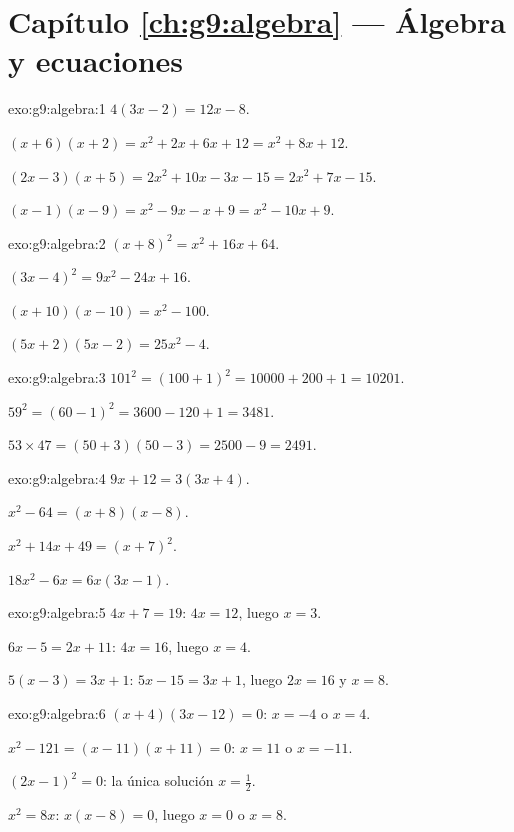 \section*{Capítulo \ref{ch:g9:algebra} --- Álgebra y ecuaciones}

\begin{solution}{exo:g9:algebra:1}
$4(3x - 2) = 12x - 8$.

$(x+6)(x+2) = x^2 + 2x + 6x + 12 = x^2 + 8x + 12$.

$(2x-3)(x+5) = 2x^2 + 10x - 3x - 15 = 2x^2 + 7x - 15$.

$(x-1)(x-9) = x^2 - 9x - x + 9 = x^2 - 10x + 9$.
\end{solution}

\begin{solution}{exo:g9:algebra:2}
$(x+8)^2 = x^2 + 16x + 64$.

$(3x-4)^2 = 9x^2 - 24x + 16$.

$(x+10)(x-10) = x^2 - 100$.

$(5x+2)(5x-2) = 25x^2 - 4$.
\end{solution}

\begin{solution}{exo:g9:algebra:3}
$101^2 = (100+1)^2 = 10000 + 200 + 1 = 10201$.

$59^2 = (60-1)^2 = 3600 - 120 + 1 = 3481$.

$53 \times 47 = (50+3)(50-3) = 2500 - 9 = 2491$.
\end{solution}

\begin{solution}{exo:g9:algebra:4}
$9x + 12 = 3(3x + 4)$.

$x^2 - 64 = (x+8)(x-8)$.

$x^2 + 14x + 49 = (x+7)^2$.

$18x^2 - 6x = 6x(3x - 1)$.
\end{solution}

\begin{solution}{exo:g9:algebra:5}
$4x + 7 = 19$: $4x = 12$, luego $x = 3$.

$6x - 5 = 2x + 11$: $4x = 16$, luego $x = 4$.

$5(x-3) = 3x + 1$: $5x - 15 = 3x + 1$, luego $2x = 16$ y $x = 8$.
\end{solution}

\begin{solution}{exo:g9:algebra:6}
$(x+4)(3x-12) = 0$: $x = -4$ o $x = 4$.

$x^2 - 121 = (x-11)(x+11) = 0$: $x = 11$ o $x = -11$.

$(2x-1)^2 = 0$: la única solución $x = \frac12$.

$x^2 = 8x$: $x(x - 8) = 0$, luego $x = 0$ o $x = 8$.
\end{solution}

